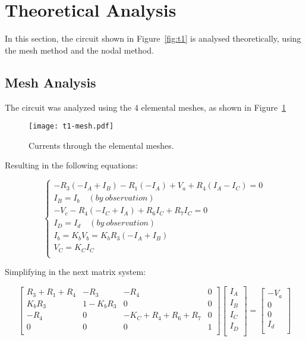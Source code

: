 \section{Theoretical Analysis}
\label{sec:analysis}

In this section, the circuit shown in Figure~\ref{fig:t1} is analysed
theoretically, using the mesh method and the nodal method.

\subsection{Mesh Analysis}
The circuit was analyzed using the 4 elemental meshes, as shown in Figure~\ref{fig:mesh}

\begin{figure}[ht!]
  \centering
  \texttt{[image: t1-mesh.pdf]}
  \caption{Currents through the elemental meshes.}
  \label{fig:mesh}
\end{figure}

Resulting in the following equations:

\begin{equation}\label{meshEq}
  \begin{cases}
    -R_3(-I_A + I_B) - R_1(-I_A) + V_a + R_4(I_A-I_C) = 0 \\
    I_B = I_b\quad (by\ observation) \\
    -V_c - R_4(-I_C + I_A) + R_6I_C+ R_7I_C = 0 \\
    I_D = I_d\quad (by\ observation) \\
    I_b = K_bV_b = K_bR_3(-I_A + I_B) \\
    V_C = K_CI_C \\
  \end{cases}
\end{equation}

Simplifying in the next matrix system:

\begin{equation}\label{meshM}
  \begin{bmatrix}
    R_3+R_1+R_4 & -R_3 & -R_4 & 0 \\
    K_bR_3 & 1-K_bR_3 & 0 & 0 \\
    -R_4 & 0 & -K_C + R_4+R_6+R_7 & 0 \\
    0 & 0 & 0 & 1\\
  \end{bmatrix}
  \begin{bmatrix}
    I_A\\
    I_B\\
    I_C\\
    I_D\\
  \end{bmatrix}
  =
  \begin{bmatrix}
    -V_a\\
    0\\
    0\\
    I_d\\
  \end{bmatrix}
\end{equation}

